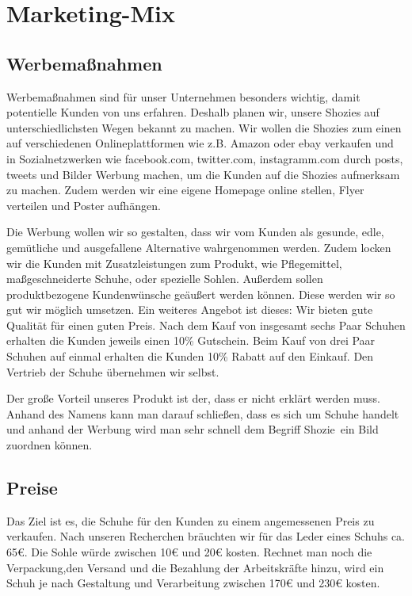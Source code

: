 \chapter{Marketing-Mix}
\label{cha:6}

\section{Werbemaßnahmen}
Werbemaßnahmen sind für unser Unternehmen besonders wichtig, damit potentielle Kunden von uns erfahren. Deshalb planen wir, unsere Shozies auf unterschiedlichsten Wegen bekannt zu machen. Wir wollen die Shozies zum einen auf verschiedenen Onlineplattformen wie z.B. Amazon oder ebay verkaufen und in Sozialnetzwerken wie facebook.com, twitter.com, instagramm.com durch posts, tweets und Bilder Werbung machen, um die Kunden auf die Shozies aufmerksam zu machen. Zudem werden wir eine eigene Homepage online stellen, Flyer verteilen und Poster aufhängen. 

Die Werbung wollen wir so gestalten, dass wir vom Kunden als gesunde, edle, gemütliche und ausgefallene Alternative wahrgenommen werden. Zudem locken wir die Kunden mit Zusatzleistungen zum Produkt, wie Pflegemittel, maßgeschneiderte Schuhe, oder spezielle Sohlen. Außerdem sollen produktbezogene Kundenwünsche geäußert werden können. Diese werden wir so gut wir möglich umsetzen. Ein weiteres Angebot ist dieses: Wir bieten gute Qualität für einen guten Preis. Nach dem Kauf von insgesamt sechs Paar Schuhen erhalten die Kunden jeweils einen 10\% Gutschein. Beim Kauf von drei Paar Schuhen auf einmal erhalten die Kunden 10\% Rabatt auf den Einkauf. Den Vertrieb der Schuhe übernehmen wir selbst.

Der große Vorteil unseres Produkt ist der, dass er nicht erklärt werden muss. Anhand des Namens kann man darauf schließen, dass es sich um Schuhe handelt und anhand der Werbung wird man sehr schnell dem Begriff \glqq Shozie\grqq\ ein Bild zuordnen können. 

\section{Preise}
Das Ziel ist es, die Schuhe für den Kunden zu einem angemessenen Preis zu verkaufen. Nach unseren Recherchen bräuchten wir für das Leder eines Schuhs ca. 65€. Die Sohle würde zwischen 10€ und 20€ kosten. Rechnet man noch die Verpackung,den Versand und die Bezahlung der Arbeitskräfte hinzu, wird ein Schuh je nach Gestaltung und Verarbeitung zwischen 170€ und 230€ kosten.
